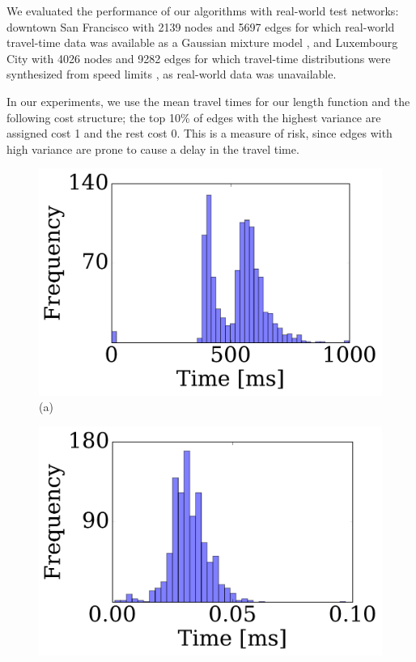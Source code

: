 We evaluated the performance of our algorithms with real-world test networks: downtown San Francisco with 2139 nodes and 5697 edges for which real-world travel-time data was available as a Gaussian mixture model \cite{sf_data}, and Luxembourg City with 4026 nodes and 9282 edges for which travel-time distributions were synthesized from speed limits \cite{niknami2016tractable}, as real-world data was unavailable.
 
In our experiments, we use the mean travel times for our length function and the following cost structure; the top 10\% of edges with the highest variance are assigned cost 1 and the rest cost 0.
This is a measure of risk, since edges with high variance are prone to cause a delay in the travel time.


\begin{figure}
\begin{minipage}[t]{.28\textwidth}
\centering
\includegraphics[clip, trim=0.2cm 0.3cm 0.4cm 0.2cm,scale=0.225]{TexImg/SF_query_dij_B25.pdf}
(a)
\end{minipage}%
\begin{minipage}[t]{.24\textwidth}
\centering
\includegraphics[clip, trim=1.65cm 0.3cm 0.2cm 0.2cm,scale=0.225]{TexImg/SF_query_hl_B25.pdf}

\end{minipage}
\end{figure}

